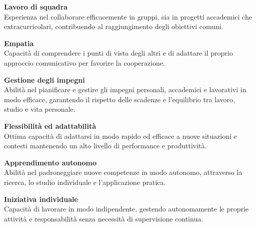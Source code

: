 \documentclass[9pt]{developercv} %
\begin{document}



\textbf{Lavoro di squadra}\\
Esperienza nel collaborare efficacemente in gruppi, sia in progetti accademici che extracurricolari, contribuendo al raggiungimento degli obiettivi comuni.

\vspace{\baselineskip}

\textbf{Empatia}\\
Capacità di comprendere i punti di vista degli altri e di adattare il proprio approccio comunicativo per favorire la cooperazione.



\textbf{Gestione degli impegni}\\
Abilità nel pianificare e gestire gli impegni personali, accademici e lavorativi in modo efficace, garantendo il rispetto delle scadenze e l'equilibrio tra lavoro, studio e vita personale.

\vspace{\baselineskip}

\textbf{Flessibilità ed adattabilità}\\
Ottima capacità di adattarsi in modo rapido ed efficace a nuove situazioni e contesti mantenendo un alto livello di performance e produttività.

\vspace{\baselineskip}

\textbf{Apprendimento autonomo}\\
Abilità nel padroneggiare nuove competenze in modo autonomo, attraverso la ricerca, lo studio individuale e l'applicazione pratica.

\vspace{\baselineskip}

\textbf{Iniziativa individuale}\\
Capacità di lavorare in modo indipendente, gestendo autonomamente le proprie attività e responsabilità senza necessità di supervisione continua.
\end{document}
